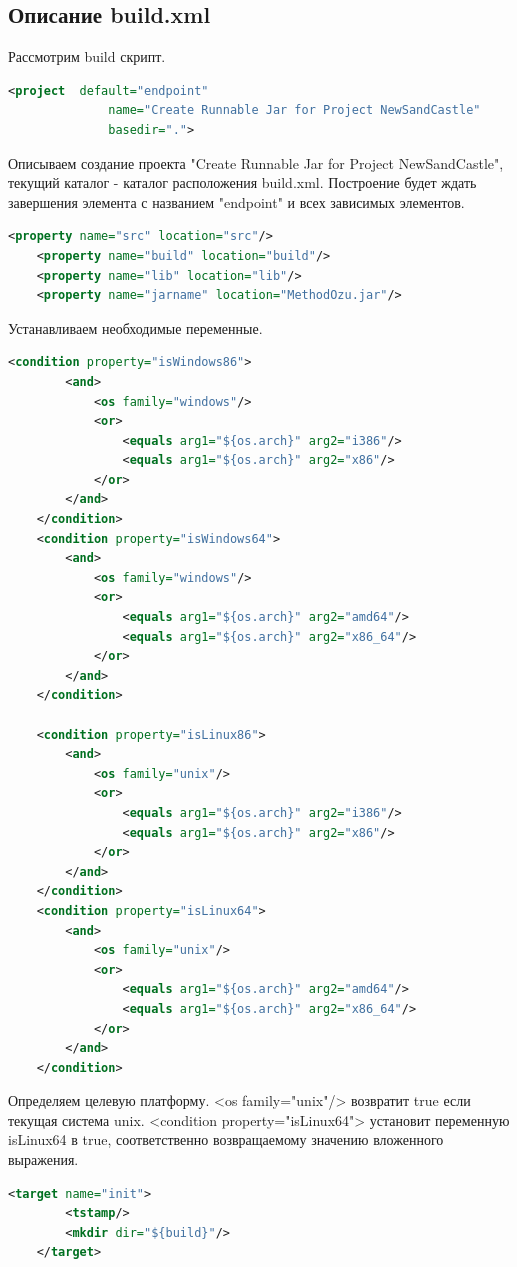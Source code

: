 \documentclass[12pt,a4paper]{extarticle} %
\begin{document}
\subsection{Описание build.xml}
    Рассмотрим build скрипт.

\begin{lstlisting}[language=xml]
    <project  default="endpoint" 
              name="Create Runnable Jar for Project NewSandCastle" 
              basedir=".">
\end{lstlisting}
    
    Описываем создание проекта "Create Runnable Jar for Project NewSandCastle", текущий каталог - каталог расположения build.xml. Построение будет ждать завершения элемента с названием "endpoint" и всех зависимых элементов.
\begin{lstlisting}[language=xml]
    <property name="src" location="src"/>
    <property name="build" location="build"/>
    <property name="lib" location="lib"/>    
    <property name="jarname" location="MethodOzu.jar"/>
\end{lstlisting}

    Устанавливаем необходимые переменные.
\begin{lstlisting}[language=xml]
    <condition property="isWindows86">
        <and>
            <os family="windows"/>
            <or>
                <equals arg1="${os.arch}" arg2="i386"/>
                <equals arg1="${os.arch}" arg2="x86"/>
            </or>
        </and>
    </condition>
    <condition property="isWindows64">
        <and>
            <os family="windows"/>
            <or>
                <equals arg1="${os.arch}" arg2="amd64"/>
                <equals arg1="${os.arch}" arg2="x86_64"/>
            </or>
        </and>        
    </condition>

    <condition property="isLinux86">
        <and>        
            <os family="unix"/>
            <or>
                <equals arg1="${os.arch}" arg2="i386"/>
                <equals arg1="${os.arch}" arg2="x86"/>
            </or>
        </and>
    </condition>
    <condition property="isLinux64">
        <and>
            <os family="unix"/>
            <or>
                <equals arg1="${os.arch}" arg2="amd64"/>
                <equals arg1="${os.arch}" arg2="x86_64"/>
            </or>
        </and>        
    </condition>
\end{lstlisting}

    Определяем целевую платформу.  <os family="unix"/> возвратит true если текущая система unix.  <condition property="isLinux64"> установит переменную isLinux64 в true, соответственно возвращаемому значению вложенного выражения.
\begin{lstlisting}[language=xml]
    <target name="init">
        <tstamp/>
        <mkdir dir="${build}"/>        
    </target>
\end{lstlisting}
\end{document}
